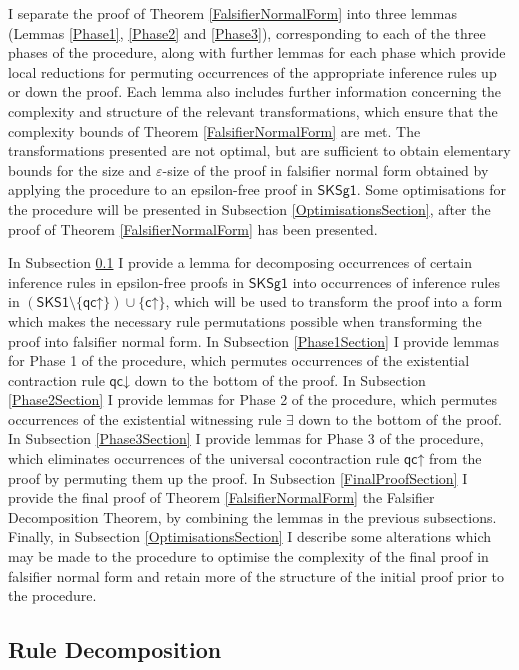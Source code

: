 \documentclass[10pt]{article}
\theoremstyle{definition}\newtheorem{remark}[theorem]{Remark}
\theoremstyle{definition}\newtheorem{example}[theorem]{Example}
\theoremstyle{definition}\newtheorem{definition}[theorem]{Definition}
\newcommand{\SKSq}{{\mathsf{SKSg1}}}
\newcommand{\SKSqDecomp}{{\mathsf{SKS1}}}
\newcommand{\cUp}{{\mathsf{c\mathord\uparrow}}}
\newcommand{\qcUp}{{\mathsf{qc\mathord\uparrow}}}
\newcommand{\qcDown}{{\mathsf{qc\mathord\downarrow}}}
\begin{document}
	I separate the proof of Theorem \ref{FalsifierNormalForm} into three lemmas (Lemmas \ref{Phase1}, \ref{Phase2} and \ref{Phase3}), corresponding to each of the three phases of the procedure, along with further lemmas for each phase which provide local reductions for permuting occurrences of the appropriate inference rules up or down the proof. Each lemma also includes further information concerning the complexity and structure of the relevant transformations, which ensure that the complexity bounds of Theorem \ref{FalsifierNormalForm} are met. The transformations presented are not optimal, but are sufficient to obtain elementary bounds for the size and $\varepsilon$-size of the proof in falsifier normal form obtained by applying the procedure to an epsilon-free proof in $\SKSq$. Some optimisations for the procedure will be presented in Subsection \ref{OptimisationsSection}, after the proof of Theorem \ref{FalsifierNormalForm} has been presented.
	
	In Subsection \ref{RuleDecompositionSection} I provide a lemma for decomposing occurrences of certain inference rules in epsilon-free proofs in $\SKSq$ into occurrences of inference rules in $(\SKSqDecomp \setminus \{\qcUp\}) \cup \{\cUp\}$, which will be used to transform the proof into a form which makes the necessary rule permutations possible when transforming the proof into falsifier normal form. In Subsection \ref{Phase1Section} I provide lemmas for Phase 1 of the procedure, which permutes occurrences of the existential contraction rule $\qcDown$ down to the bottom of the proof. In Subsection \ref{Phase2Section} I provide lemmas for Phase 2 of the procedure, which permutes occurrences of the existential witnessing rule $\exists$ down to the bottom of the proof. In Subsection \ref{Phase3Section} I provide lemmas for Phase 3 of the procedure, which eliminates occurrences of the universal cocontraction rule $\qcUp$ from the proof by permuting them up the proof. In Subsection \ref{FinalProofSection} I provide the final proof of Theorem \ref{FalsifierNormalForm} the Falsifier Decomposition Theorem, by combining the lemmas in the previous subsections. Finally, in Subsection \ref{OptimisationsSection} I describe some alterations which may be made to the procedure to optimise the complexity of the final proof in falsifier normal form and retain more of the structure of the initial proof prior to the procedure.
	
	\subsection{Rule Decomposition}\label{RuleDecompositionSection}
	
\end{document}
